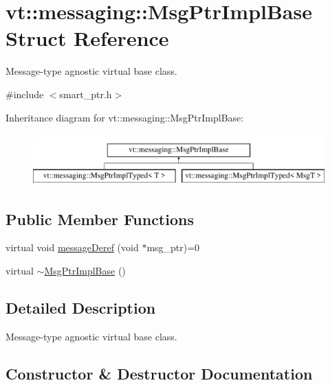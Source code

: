 \hypertarget{structvt_1_1messaging_1_1_msg_ptr_impl_base}{}\section{vt\+:\+:messaging\+:\+:Msg\+Ptr\+Impl\+Base Struct Reference}
\label{structvt_1_1messaging_1_1_msg_ptr_impl_base}


Message-\/type agnostic virtual base class.  




{\ttfamily \#include $<$smart\+\_\+ptr.\+h$>$}

Inheritance diagram for vt\+:\+:messaging\+:\+:Msg\+Ptr\+Impl\+Base\+:\begin{figure}[H]
\begin{center}
\leavevmode
\includegraphics[height=2.000000cm]{structvt_1_1messaging_1_1_msg_ptr_impl_base}
\end{center}
\end{figure}
\subsection*{Public Member Functions}
\begin{DoxyCompactItemize}
\item 
virtual void \hyperlink{structvt_1_1messaging_1_1_msg_ptr_impl_base_a654574717593bf92d031c055731ef41e}{message\+Deref} (void $\ast$msg\+\_\+ptr)=0
\item 
virtual \hyperlink{structvt_1_1messaging_1_1_msg_ptr_impl_base_afcf8208d8636a3793ccdf4bc7d4ee12a}{$\sim$\+Msg\+Ptr\+Impl\+Base} ()
\end{DoxyCompactItemize}


\subsection{Detailed Description}
Message-\/type agnostic virtual base class. 

\subsection{Constructor \& Destructor Documentation}
\mbox{\label{structvt_1_1messaging_1_1_msg_ptr_impl_base_afcf8208d8636a3793ccdf4bc7d4ee12a}} 
